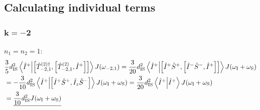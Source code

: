 \begin{appendixtext}
\subsection{Calculating individual terms} \label{subsecB.3.1}
\subsubsection{$\mathbf{k = -2}$}
$n_1 = n_2 = 1$:
\begin{align*}
&\frac{3}{5} d_{\text{IS}}^2 \bra{\hat{I}^+} \ket{\comm{\hat{T}_{-2, 1}^{(2) \dagger}}{\comm{\hat{T}_{-2,1}^{(2)}}{\hat{I}^+}}} J(\omega_{-2,1}) = \frac{3}{20} d_{\text{IS}}^2 \bra{\hat{I}^+} \ket{\comm{\hat{I}^+ \hat{S}^+}{\comm{\hat{I}^- \hat{S}^-}{\hat{I}^+}}} J(\omega_{\text{I}} + \omega_{\text{S}}) \\
&= -\frac{3}{10} d_{\text{IS}}^2 \bra{\hat{I}^+} \ket{\comm{\hat{I}^+ \hat{S}^+}{\hat{I}_z \hat{S}^-}} J(\omega_{\text{I}} + \omega_{\text{S}}) = \frac{3}{20} d_{\text{IS}}^2 \bra{\hat{I}^+} \ket{\hat{I}^+} J(\omega_{\text{I}} + \omega_{\text{S}}) \\
&= \underline{\frac{3}{10} d_{\text{IS}}^2 J(\omega_{\text{I}} + \omega_{\text{S}})}
\end{align*}

\end{appendixtext}
